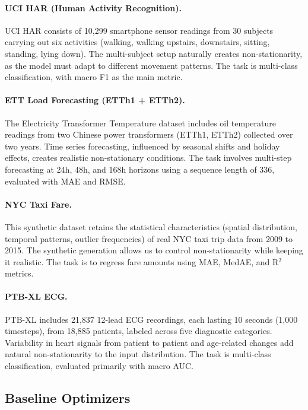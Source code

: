 \documentclass[11pt,a4paper]{article}
\begin{document}
\paragraph{UCI HAR (Human Activity Recognition).} UCI HAR \citep{anguita2013ucihar} consists of 10,299 smartphone sensor readings from 30 subjects carrying out six activities (walking, walking upstairs, downstairs, sitting, standing, lying down). The multi-subject setup naturally creates non-stationarity, as the model must adapt to different movement patterns. The task is multi-class classification, with macro F1 as the main metric.

\paragraph{ETT Load Forecasting (ETTh1 + ETTh2).} The Electricity Transformer Temperature dataset \citep{zhou2021informer} includes oil temperature readings from two Chinese power transformers (ETTh1, ETTh2) collected over two years. Time series forecasting, influenced by seasonal shifts and holiday effects, creates realistic non-stationary conditions. The task involves multi-step forecasting at 24h, 48h, and 168h horizons using a sequence length of 336, evaluated with MAE and RMSE.

\paragraph{NYC Taxi Fare.} This synthetic dataset retains the statistical characteristics (spatial distribution, temporal patterns, outlier frequencies) of real NYC taxi trip data from 2009 to 2015. The synthetic generation allows us to control non-stationarity while keeping it realistic. The task is to regress fare amounts using MAE, MedAE, and R$^2$ metrics.

\paragraph{PTB-XL ECG.} PTB-XL \citep{wagner2020ptbxl} includes 21,837 12-lead ECG recordings, each lasting 10 seconds (1,000 timesteps), from 18,885 patients, labeled across five diagnostic categories. Variability in heart signals from patient to patient and age-related changes add natural non-stationarity to the input distribution. The task is multi-class classification, evaluated primarily with macro AUC.

\subsection{Baseline Optimizers}
\end{document}
